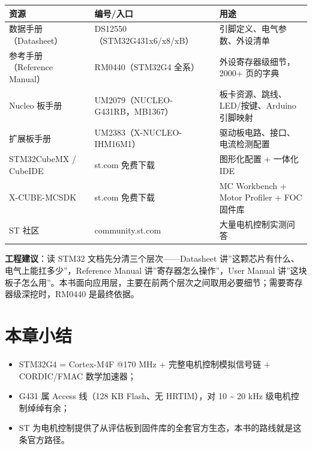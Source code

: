 \documentclass[
  UTF8,
  scheme=plain,
  fontsize=10pt,
  openany
]{ctexbook}
\begin{document}
{\def\LTcaptype{none} %
\begin{longtable}[]{@{}
  >{\raggedright\arraybackslash}p{}
  >{\raggedright\arraybackslash}p{}
  >{\raggedright\arraybackslash}p{}@{}}
\toprule\noalign{}
\begin{minipage}[b]{\linewidth}\raggedright
资源
\end{minipage} & \begin{minipage}[b]{\linewidth}\raggedright
编号/入口
\end{minipage} & \begin{minipage}[b]{\linewidth}\raggedright
用途
\end{minipage} \\
\midrule\noalign{}
\endhead
\bottomrule\noalign{}
\endlastfoot
数据手册（Datasheet） & DS12550（STM32G431x6/x8/xB） &
引脚定义、电气参数、外设清单 \\
参考手册（Reference Manual） & RM0440（STM32G4 全系） &
外设寄存器级细节，2000+ 页的字典 \\
Nucleo 板手册 & UM2079（NUCLEO-G431RB，MB1367） &
板卡资源、跳线、LED/按键、Arduino 引脚映射 \\
扩展板手册 & UM2383（X-NUCLEO-IHM16M1） &
驱动板电路、接口、电流检测配置 \\
STM32CubeMX / CubeIDE & st.com 免费下载 & 图形化配置 + 一体化 IDE \\
X-CUBE-MCSDK & st.com 免费下载 & MC Workbench + Motor Profiler + FOC
固件库 \\
ST 社区 & community.st.com & 大量电机控制实测问答 \\
\end{longtable}
}

\textbf{工程建议}：读 STM32 文档先分清三个层次------Datasheet
讲''这颗芯片有什么、电气上能扛多少''，Reference Manual
讲''寄存器怎么操作''，User Manual
讲''这块板子怎么用''。本书面向应用层，主要在前两个层次之间取用必要细节；需要寄存器级深挖时，RM0440
是最终依据。

\section{本章小结}\label{ux672cux7ae0ux5c0fux7ed3}

\begin{itemize}
\tightlist
\item
  STM32G4 = Cortex-M4F @170 MHz + 完整电机控制模拟信号链 + CORDIC/FMAC
  数学加速器；
\item
  G431 属 Access 线（128 KB Flash、无 HRTIM），对 10 \textasciitilde{}
  20 kHz 级电机控制绰绰有余；
\item
  ST
  为电机控制提供了从评估板到固件库的全套官方生态，本书的路线就是这条官方路径。
\end{itemize}
\end{document}
